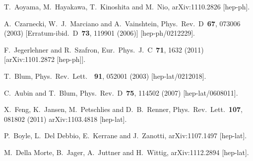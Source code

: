 \begin{thebibliography}{99}
  T.~Aoyama, M.~Hayakawa, T.~Kinoshita and M.~Nio,
  arXiv:1110.2826 [hep-ph].

  A.~Czarnecki, W.~J.~Marciano and A.~Vainshtein,
  Phys.\ Rev.\ D\ {\bf 67}, 073006  (2003)
  [Erratum-ibid.\ D\ {\bf 73}, 119901  (2006)]
  [hep-ph/0212229].

  F.~Jegerlehner and R.~Szafron,
  Eur.\ Phys.\ J.\ C\ {\bf 71}, 1632  (2011)
  [arXiv:1101.2872 [hep-ph]].

  T.~Blum,
  Phys.\ Rev.\ Lett.\ \ {\bf 91}, 052001  (2003)
  [hep-lat/0212018].

  C.~Aubin and T.~Blum,
  Phys.\ Rev.\ D\ {\bf 75}, 114502  (2007)
  [hep-lat/0608011].

  X.~Feng, K.~Jansen, M.~Petschlies and D.~B.~Renner,
  Phys.\ Rev.\ Lett.\ {\bf 107}, 081802  (2011) 
  arXiv:1103.4818 [hep-lat].

  P.~Boyle, L.~Del Debbio, E.~Kerrane and J.~Zanotti,
  arXiv:1107.1497 [hep-lat].
  
  M.~Della Morte, B.~Jager, A.~Juttner and H.~Wittig,
  arXiv:1112.2894 [hep-lat].
  

\end{thebibliography}
